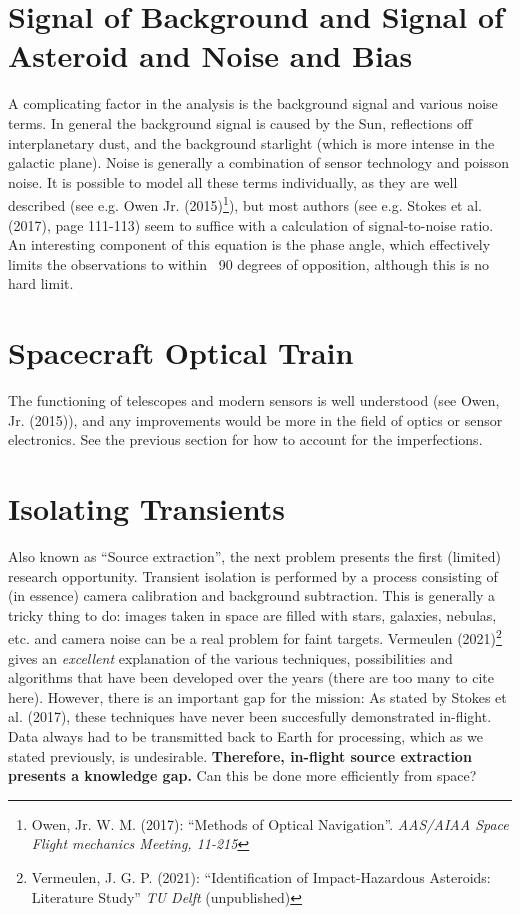 \documentclass[a4paper,10pt]{article}
\begin{document}
\section{Signal of Background and Signal of Asteroid and Noise and Bias}
A complicating factor in the analysis is the background signal and various noise terms. In general the background signal is caused by the Sun, reflections off interplanetary dust, and the background starlight (which is more intense in the galactic plane). Noise is generally a combination of sensor technology and poisson noise. It is possible to model all these terms individually, as they are well described (see e.g. Owen Jr. (2015)\footnote{Owen, Jr. W. M. (2017): ``Methods of Optical Navigation''. \textit{AAS/AIAA Space Flight mechanics Meeting, 11-215}}), but most authors (see e.g. Stokes et al. (2017), page 111-113) seem to suffice with a calculation of signal-to-noise ratio. An interesting component of this equation is the phase angle, which effectively limits the observations to within ~90 degrees of opposition, although this is no hard limit.

\section{Spacecraft Optical Train}
The functioning of telescopes and modern sensors is well understood (see Owen, Jr. (2015)), and any improvements would be more in the field of optics or sensor electronics. See the previous section for how to account for the imperfections.

\section{Isolating Transients}
Also known as ``Source extraction'', the next problem presents the first (limited) research opportunity. Transient isolation is performed by a process consisting of (in essence) camera calibration and background subtraction. This is generally a tricky thing to do: images taken in space are filled with stars, galaxies, nebulas, etc. and camera noise can be a real problem for faint targets. Vermeulen (2021)\footnote{Vermeulen, J. G. P. (2021): ``Identification of Impact-Hazardous Asteroids: Literature Study'' \textit{TU Delft} (unpublished)} gives an \textit{excellent} explanation of the various techniques, possibilities and algorithms that have been developed over the years (there are too many to cite here). However, there is an important gap for the mission: As stated by Stokes et al. (2017), these techniques have never been succesfully demonstrated in-flight. Data always had to be transmitted back to Earth for processing, which as we stated previously, is undesirable. \textbf{Therefore, in-flight source extraction presents a knowledge gap.} Can this be done more efficiently from space?
\end{document}
